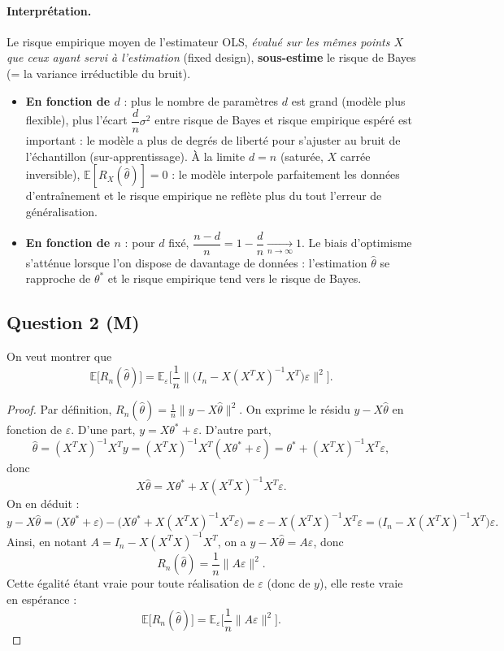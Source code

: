\documentclass[11pt]{article}
\theoremstyle{remark}
\newcommand{\E}{\mathbb{E}}
\begin{document}
\paragraph{Interprétation.}
Le risque empirique moyen de l'estimateur OLS, \emph{évalué sur les mêmes points $X$ que ceux ayant servi à l'estimation} (fixed design), \textbf{sous-estime} le risque de Bayes (= la variance irréductible du bruit). 
\begin{itemize}
  \item \textbf{En fonction de $d$} : plus le nombre de paramètres $d$ est grand (modèle plus flexible), plus l'écart $\dfrac{d}{n}\sigma^2$ entre risque de Bayes et risque empirique espéré est important : le modèle a plus de degrés de liberté pour s'ajuster au bruit de l'échantillon (sur-apprentissage). À la limite $d=n$ (saturée, $X$ carrée inversible), $\E[R_X(\hat\theta)] = 0$ : le modèle interpole parfaitement les données d'entraînement et le risque empirique ne reflète plus du tout l'erreur de généralisation.
  \item \textbf{En fonction de $n$} : pour $d$ fixé, $\dfrac{n-d}{n} = 1-\dfrac{d}{n} \xrightarrow[n\to\infty]{} 1$. Le biais d'optimisme s'atténue lorsque l'on dispose de davantage de données : l'estimation $\hat\theta$ se rapproche de $\theta^*$ et le risque empirique tend vers le risque de Bayes.
\end{itemize}

\subsection*{Question 2 (M)}

On veut montrer que
\[
  \E\big[R_n(\hat\theta)\big] = \E_\varepsilon\Big[\frac{1}{n}\big\|\big(I_n - X(X^TX)^{-1}X^T\big)\varepsilon\big\|^2\Big].
\]

\begin{proof}
Par définition, $R_n(\hat\theta) = \frac1n \|y - X\hat\theta\|^2$. On exprime le résidu $y-X\hat\theta$ en fonction de $\varepsilon$. D'une part, $y = X\theta^* + \varepsilon$. D'autre part,
\[
  \hat\theta = (X^TX)^{-1}X^Ty = (X^TX)^{-1}X^T(X\theta^*+\varepsilon) = \theta^* + (X^TX)^{-1}X^T\varepsilon,
\]
donc
\[
  X\hat\theta = X\theta^* + X(X^TX)^{-1}X^T\varepsilon.
\]
On en déduit :
\[
  y - X\hat\theta = \big(X\theta^* + \varepsilon\big) - \big(X\theta^* + X(X^TX)^{-1}X^T\varepsilon\big) = \varepsilon - X(X^TX)^{-1}X^T\varepsilon = \big(I_n - X(X^TX)^{-1}X^T\big)\varepsilon.
\]
Ainsi, en notant $A = I_n - X(X^TX)^{-1}X^T$, on a $y-X\hat\theta = A\varepsilon$, donc
\[
  R_n(\hat\theta) = \frac1n\|A\varepsilon\|^2.
\]
Cette égalité étant vraie pour toute réalisation de $\varepsilon$ (donc de $y$), elle reste vraie en espérance :
\[
  \E\big[R_n(\hat\theta)\big] = \E_\varepsilon\Big[\frac1n\|A\varepsilon\|^2\Big].
\]
\end{proof}
\end{document}
